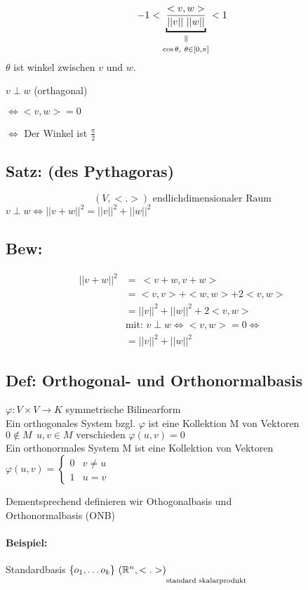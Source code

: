 \documentclass[titlepage,12pt,a4paper,ngerman]{report}
\newcommand{\verteq}{\rotatebox{90}{$\,=$}}
\newcommand{\equalto}[2]{\underset{\scriptstyle\overset{\mkern4mu\verteq}{#2}}{#1}}
\newcommand{\tx}[1]{\textrm{#1}}
\newcommand{\casess}[4]{\left\{ \begin{array}{ll} {#1} & {#2} \\ {#3} & {#4} \end{array} \right.}
\begin{document}
$$-1 < \equalto{\underbracket{\frac{<v,w>}{||v||\ ||w||}}}{ \cos \theta ,\ \theta \in [0, \pi]}<1$$
$\theta$ ist winkel zwischen $v$ und $w$.
\begin{trivlist}
	\item $v \perp w$ (orthagonal) 
	\item $\Leftrightarrow <v,w> = 0$
	\item $\Leftrightarrow$ Der Winkel ist $\frac{\pi}{2}$
\end{trivlist}

\subsection{Satz: (des Pythagoras)}
$$(V, <.>) \tx{ endlichdimensionaler Raum}$$
$v \perp w \Leftrightarrow ||v + w||^2 = ||v||^2 + ||w||^2$

\subsection{Bew:}
\begin{align*}
||v+w||^2 &=\  <v+w,v+w> \ \\ 
&= <v,v>+<w,w> + 2<v,w>\\
&= ||v||^2 + ||w||^2 + 2 <v,w> \\
&\tx{mit: } v\perp w \Leftrightarrow <v,w> = 0 \Leftrightarrow \\
&= ||v||^2 + ||w||^2
\end{align*}
\subsection{Def: Orthogonal- und Orthonormalbasis}
$ \varphi:V\times V \to K $ symmetrische Bilinearform\\
Ein orthogonales System bzgl. $ \varphi $ ist eine Kollektion M von Vektoren $ 0 \notin M \ \ u,v \in M \tx{ verschieden } \varphi(u,v) = 0 $\\
Ein orthonormales System M ist eine Kollektion von Vektoren\\ $ \varphi(u,v) = \casess{0}{v\neq u}{1}{u=v} $

Dementsprechend definieren wir Othogonalbasis und \\ 
Orthonormalbasis (ONB)
\paragraph{Beispiel:}
Standardbasis $\{o_1, \dots o_k \}\ (\mathbb R^n, \underset{\scriptstyle}{<.>)}_{\tx{standard skalarprodukt}}$
\end{document}

